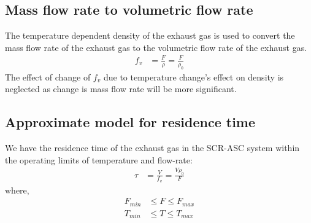 \subsection{Mass flow rate to volumetric flow rate}
The temperature dependent density of the exhaust gas is used to convert the mass
flow rate of the exhaust gas to the volumetric flow rate of the exhaust gas.
\begin{align}
    f_v &= \frac{F}{\rho} = \frac{F}{\rho_0}  \label{eqn::fv_approx}
\end{align}
The effect of change of $f_v$ due to temperature change's effect on density is neglected as change is mass flow rate will be more significant.

\subsection{Approximate model for residence time}
We have the residence time of the exhaust gas in the SCR-ASC system within the operating limits of temperature and flow-rate:
\begin{align}
    \tau &= \frac{V}{f_v} = \frac{V \rho_0}{F} \label{eqn::res_time}
\end{align}
where,
\begin{align*}
    F_{min} &\leq F \leq F_{max}\\
    T_{min} &\leq T \leq T_{max}
\end{align*}
